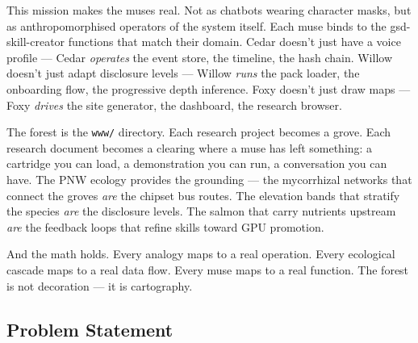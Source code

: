 \documentclass[11pt,letterpaper]{article}
\begin{document}
This mission makes the muses real. Not as chatbots wearing character masks, but as anthropomorphised operators of the system itself. Each muse binds to the gsd-skill-creator functions that match their domain. Cedar doesn't just have a voice profile --- Cedar \emph{operates} the event store, the timeline, the hash chain. Willow doesn't just adapt disclosure levels --- Willow \emph{runs} the pack loader, the onboarding flow, the progressive depth inference. Foxy doesn't just draw maps --- Foxy \emph{drives} the site generator, the dashboard, the research browser.

The forest is the \texttt{www/} directory. Each research project becomes a grove. Each research document becomes a clearing where a muse has left something: a cartridge you can load, a demonstration you can run, a conversation you can have. The PNW ecology provides the grounding --- the mycorrhizal networks that connect the groves \emph{are} the chipset bus routes. The elevation bands that stratify the species \emph{are} the disclosure levels. The salmon that carry nutrients upstream \emph{are} the feedback loops that refine skills toward GPU promotion.

And the math holds. Every analogy maps to a real operation. Every ecological cascade maps to a real data flow. Every muse maps to a real function. The forest is not decoration --- it is cartography.

\subsection{Problem Statement}
\end{document}

